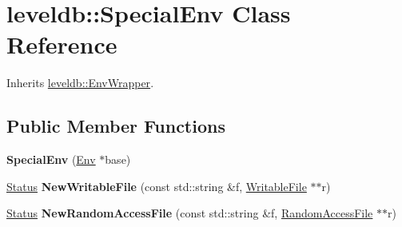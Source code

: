 \hypertarget{classleveldb_1_1_special_env}{}\section{leveldb\+::Special\+Env Class Reference}
\label{classleveldb_1_1_special_env}


Inherits \mbox{\hyperlink{classleveldb_1_1_env_wrapper}{leveldb\+::\+Env\+Wrapper}}.

\subsection*{Public Member Functions}
\begin{DoxyCompactItemize}
\item 
\mbox{\label{classleveldb_1_1_special_env_a29fed9502e35a1f9374e0f46f4bd1181}} 
{\bfseries Special\+Env} (\mbox{\hyperlink{classleveldb_1_1_env}{Env}} $\ast$base)
\item 
\mbox{\label{classleveldb_1_1_special_env_a2a8b88051ccc5f957321d47af0dae5ed}} 
\mbox{\hyperlink{classleveldb_1_1_status}{Status}} {\bfseries New\+Writable\+File} (const std\+::string \&f, \mbox{\hyperlink{classleveldb_1_1_writable_file}{Writable\+File}} $\ast$$\ast$r)
\item 
\mbox{\label{classleveldb_1_1_special_env_ae04ba2b7b94753d805e316dbda74ec00}} 
\mbox{\hyperlink{classleveldb_1_1_status}{Status}} {\bfseries New\+Random\+Access\+File} (const std\+::string \&f, \mbox{\hyperlink{classleveldb_1_1_random_access_file}{Random\+Access\+File}} $\ast$$\ast$r)
\end{DoxyCompactItemize}
